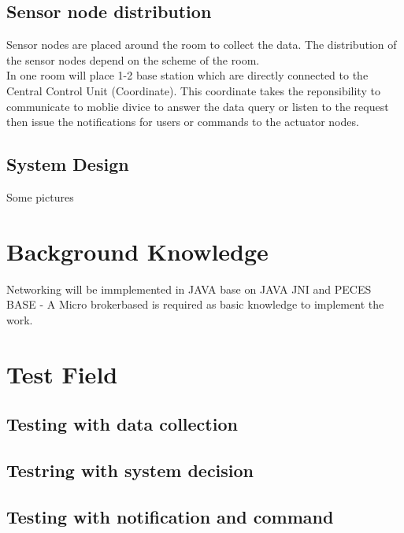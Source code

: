 \documentclass[a4paper, 12pt]{article}
\begin{document}
\subsection{Sensor node distribution}
Sensor nodes are placed around the room to collect the data. The distribution of the sensor nodes depend on the scheme of the room. \\
In one room will place 1-2 base station which are directly connected to the Central Control Unit (Coordinate). This coordinate takes the reponsibility to communicate to moblie divice to answer the data query or listen to the request then issue the notifications for users or commands to the actuator nodes.
\subsection{System Design}
Some pictures
\section{Background Knowledge}
Networking will be immplemented in JAVA base on JAVA JNI and PECES\\
BASE - A Micro brokerbased is required as basic knowledge to implement the work.
\section{Test Field}
\subsection{Testing with data collection}
\subsection{Testring with system decision}
\subsection{Testing with notification and command}
\end{document}
